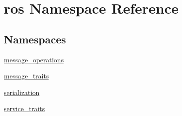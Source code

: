 \hypertarget{namespaceros}{}\section{ros Namespace Reference}
\label{namespaceros}
\subsection*{Namespaces}
\begin{DoxyCompactItemize}
\item 
 \hyperlink{namespaceros_1_1message__operations}{message\+\_\+operations}
\item 
 \hyperlink{namespaceros_1_1message__traits}{message\+\_\+traits}
\item 
 \hyperlink{namespaceros_1_1serialization}{serialization}
\item 
 \hyperlink{namespaceros_1_1service__traits}{service\+\_\+traits}
\end{DoxyCompactItemize}

